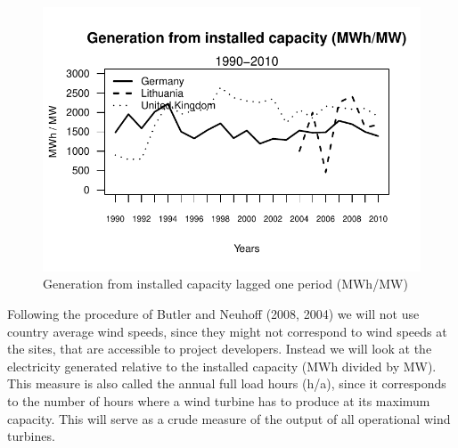 \documentclass[a4paper, 12pt]{article}
\begin{document}
\begin{figure}
	\centering
		\includegraphics[width=1\textwidth]{figure_generation-capacity}
		\caption{Generation from installed capacity lagged one period (MWh/MW)}
		\label{fig:figure_generation-capacity}
\end{figure}

Following the procedure of Butler and Neuhoff (2008, 2004) we will not use country average wind speeds, since they might not correspond to wind speeds at the sites, that are accessible to project developers. Instead we will look at the electricity generated relative to the installed capacity (MWh divided by MW). This measure is also called the annual full load hours (h/a), since it corresponds to the number of hours where a wind turbine has to produce at its maximum capacity. This will serve as a crude measure of the output of all operational wind turbines. 
\end{document}
